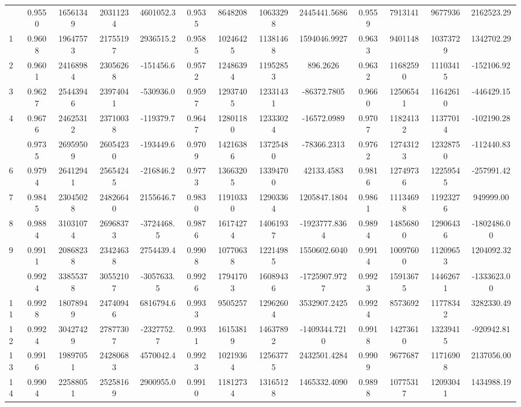 \documentclass[
  12pt,
]{article}
\begin{document}
\begin{longtable}[t]{lcccccccccccc}
\endfoot
\bottomrule
\endlastfoot
0 & 0.9550 & 16561349 & 20311234 & 4601052.3 & 0.9535 & 8648208 & 10633298 & 2445441.5686 & 0.9559 & 7913141 & 9677936 & 2162523.29\\
1 & 0.9608 & 19647573 & 21755197 & 2936515.2 & 0.9585 & 10246425 & 11381468 & 1594046.9927 & 0.9633 & 9401148 & 10373729 & 1342702.29\\
2 & 0.9601 & 24168984 & 23056268 & -151456.6 & 0.9572 & 12486394 & 11952853 & 896.2626 & 0.9632 & 11682590 & 11103415 & -152106.92\\
3 & 0.9627 & 25443946 & 23974041 & -530936.0 & 0.9597 & 12937405 & 12331431 & -86372.7805 & 0.9660 & 12506541 & 11642610 & -446429.15\\
4 & 0.9676 & 24625312 & 23710038 & -119379.7 & 0.9647 & 12801180 & 12333024 & -16572.0989 & 0.9707 & 11824132 & 11377014 & -102190.28\\
\addlinespace
5 & 0.9735 & 26959509 & 26054230 & -193449.6 & 0.9709 & 14216386 & 13725480 & -78366.2313 & 0.9762 & 12743123 & 12328750 & -112440.83\\
6 & 0.9794 & 26412941 & 25654245 & -216846.2 & 0.9773 & 13663205 & 13394700 & 42133.4583 & 0.9816 & 12749736 & 12259545 & -257991.42\\
7 & 0.9845 & 23045028 & 24826640 & 2155646.7 & 0.9830 & 11910330 & 12903364 & 1205847.1804 & 0.9861 & 11134698 & 11923276 & 949999.00\\
8 & 0.9884 & 31031074 & 26968373 & -3724468.5 & 0.9876 & 16174274 & 14061937 & -1923777.8364 & 0.9894 & 14856800 & 12906436 & -1802486.00\\
9 & 0.9911 & 20868238 & 23424638 & 2754439.4 & 0.9908 & 10770638 & 12214985 & 1550602.6040 & 0.9914 & 10097600 & 11209653 & 1204092.32\\
\addlinespace
10 & 0.9924 & 33855378 & 30552107 & -3057633.5 & 0.9926 & 17941703 & 16089436 & -1725907.9727 & 0.9923 & 15913675 & 14462671 & -1333623.00\\
11 & 0.9928 & 18078949 & 24740946 & 6816794.6 & 0.9933 & 9505257 & 12962604 & 3532907.2425 & 0.9924 & 8573692 & 11778342 & 3282330.49\\
12 & 0.9924 & 30427429 & 27877307 & -2327752.7 & 0.9931 & 16153819 & 14637892 & -1409344.7210 & 0.9918 & 14273610 & 13239415 & -920942.81\\
13 & 0.9916 & 19897051 & 24280683 & 4570042.4 & 0.9923 & 10219364 & 12563775 & 2432501.4284 & 0.9909 & 9677687 & 11716908 & 2137056.00\\
14 & 0.9904 & 22588051 & 25258169 & 2900955.0 & 0.9910 & 11812734 & 13165128 & 1465332.4090 & 0.9898 & 10775317 & 12093041 & 1434988.19\\

\end{longtable}
\end{document}
